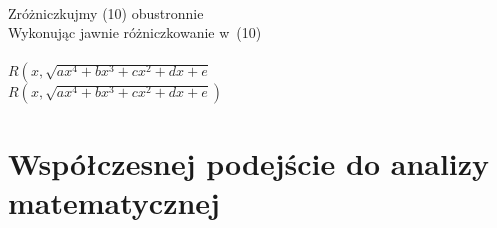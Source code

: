 \documentclass[a4paper,11pt]{article}
\begin{document}
\vspace{\spaceTwo}


 \\
\Jest  Zróżniczkujmy (10) obustronnie \\
\Powin Wykonując jawnie różniczkowanie w~(10) \\
 \\
\Jest  $R\left( x, \sqrt{ a x^{ 4 } + b x^{ 3 } + c x^{ 2 } + d x + e }
\right.$ \\
\Powin $R\left( x, \sqrt{ a x^{ 4 } + b x^{ 3 } + c x^{ 2 } + d x + e }
\right)$ \\












\section{Współczesnej podejście do analizy matematycznej}

\vspace{\spaceTwo}



















\end{document}
